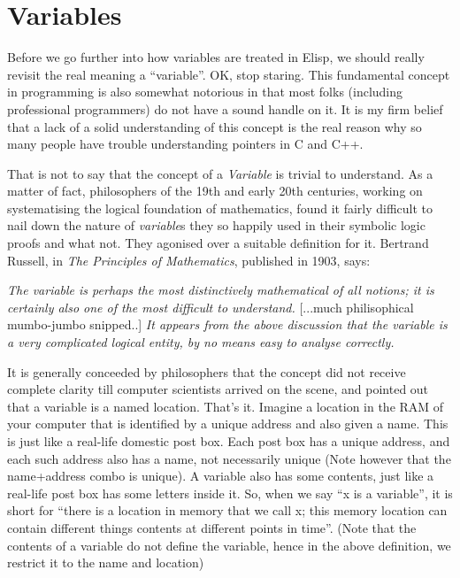 \documentclass[10pt]{article}
\begin{document}
\section{Variables}

Before we go further into how variables are treated in Elisp, we should really
revisit the real meaning a ``variable''.  OK, stop staring.  This fundamental
concept in programming is also somewhat notorious in that most folks (including
professional programmers) do not have a sound handle on it.  It is my firm
belief that a lack of a solid understanding of this concept is the real reason
why so many people have trouble understanding pointers in C and C++.

That is not to say that the concept of a \textit{Variable} is trivial to
understand.  As a matter of fact, philosophers of the 19th and early 20th
centuries, working on systematising the logical foundation of mathematics,
found it fairly difficult to nail down the nature of \textit{variable}s they so
happily used in their symbolic logic proofs and what not.  They agonised over a
suitable definition for it.  Bertrand Russell, in \textit{The Principles of
  Mathematics}, published in 1903, says:

{\parindent=50pt  

  {\narrower\smallskip\textit{The variable is perhaps the most distinctively
      mathematical of all notions; it is certainly also one of the most
      difficult to understand.} [...much philisophical mumbo-jumbo snipped..]
    \textit{It appears from the above discussion that the variable is a very
      complicated logical entity, by no means easy to analyse
      correctly.}\smallskip}}

It is generally conceeded by philosophers that the concept did not receive
complete clarity till computer scientists arrived on the scene, and pointed out
that a variable is a named location.  That's it.  Imagine a location in the RAM
of your computer that is identified by a unique address and also given a name.
This is just like a real-life domestic post box.  Each post box has a unique
address, and each such address also has a name, not necessarily unique (Note
however that the name+address combo is unique).  A variable also has some
contents, just like a real-life post box has some letters inside it.  So, when
we say ``x is a variable'', it is short for ``there is a location in memory
that we call x; this memory location can contain different things contents at
different points in time''.  (Note that the contents of a variable do not
define the variable, hence in the above definition, we restrict it to the name
and location)
\end{document}

